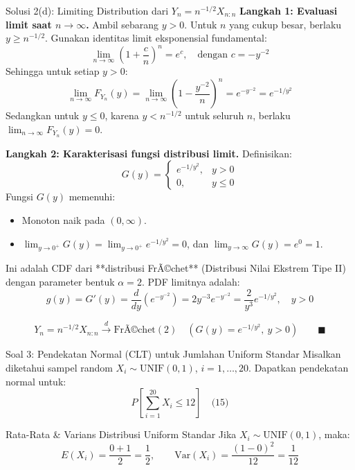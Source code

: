 \documentclass[10pt,twoside]{article}
\begin{document}
\begin{solbox}{Solusi 2(d): Limiting Distribution dari $Y_n = n^{-1/2} X_{n:n}$}
\textbf{Langkah 1: Evaluasi limit saat $n \to \infty$.}
Ambil sebarang $y > 0$. Untuk $n$ yang cukup besar, berlaku $y \ge n^{-1/2}$.
Gunakan identitas limit eksponensial fundamental:
\[
\lim_{n \to \infty} \left(1 + \frac{c}{n}\right)^n = e^c, \quad \text{dengan } c = -y^{-2}
\]
Sehingga untuk setiap $y > 0$:
\[
\lim_{n \to \infty} F_{Y_n}(y) = \lim_{n \to \infty} \left(1 - \frac{y^{-2}}{n}\right)^n = e^{-y^{-2}} = e^{-1/y^2}
\]
Sedangkan untuk $y \le 0$, karena $y < n^{-1/2}$ untuk seluruh $n$, berlaku $\lim_{n \to \infty} F_{Y_n}(y) = 0$.

\textbf{Langkah 2: Karakterisasi fungsi distribusi limit.}
Definisikan:
\[
G(y) = \begin{cases} e^{-1/y^2}, & y > 0 \\ 0, & y \le 0 \end{cases}
\]
Fungsi $G(y)$ memenuhi:
\begin{itemize}
  \item Monoton naik pada $(0, \infty)$.
  \item $\lim_{y \to 0^+} G(y) = \lim_{y \to 0^+} e^{-1/y^2} = 0$, dan $\lim_{y \to \infty} G(y) = e^0 = 1$.
\end{itemize}
Ini adalah CDF dari **distribusi FrÃ©chet** (Distribusi Nilai Ekstrem Tipe II) dengan parameter bentuk $\alpha = 2$.
PDF limitnya adalah:
\[
g(y) = G'(y) = \frac{d}{dy}\left(e^{-y^{-2}}\right) = 2y^{-3} e^{-y^{-2}} = \frac{2}{y^3} e^{-1/y^2}, \quad y > 0
\]

\[
\boxed{Y_n = n^{-1/2} X_{n:n} \xrightarrow{d} \text{FrÃ©chet}(2) \quad \left(G(y) = e^{-1/y^2}, \ y > 0\right)} \qquad \blacksquare
\]
\end{solbox}

\begin{soalbox}{Soal 3: Pendekatan Normal (CLT) untuk Jumlahan Uniform Standar}
Misalkan diketahui sampel random $X_i \sim \text{UNIF}(0,1)$, $i = 1, \dots, 20$. Dapatkan pendekatan normal untuk:
\[
P\left[\sum_{i=1}^{20} X_i \le 12\right] \quad \text{(15)}
\]
\end{soalbox}

\begin{tipbox}{Rata-Rata \& Varians Distribusi Uniform Standar}
Jika $X_i \sim \text{UNIF}(0, 1)$, maka:
\[
E(X_i) = \frac{0 + 1}{2} = \frac{1}{2}, \qquad \mathrm{Var}(X_i) = \frac{(1 - 0)^2}{12} = \frac{1}{12}
\]
\end{tipbox}
\end{document}
